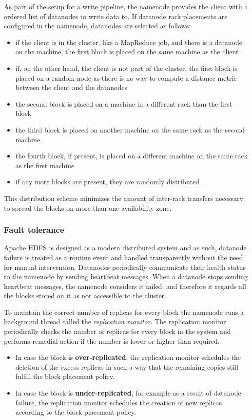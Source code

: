 As part of the setup for a write pipeline, the namenode provides the client with a ordered list of datanodes to write data to.
If datanode rack placements are configured in the namenode, datanodes are selected as follows:
\begin{itemize}
\item if the client is in the cluster, like a MapReduce job, and there is a datanode on the machine, the first block is placed on the same machine as the client
\item if, on the other hand, the client is not part of the cluster, the first block is placed on a random node as there is no way to compute a distance metric between the client and the datanodes
\item the second block is placed on a machine in a different rack than the first block
\item the third block is placed on another machine on the same rack as the second machine
\item the fourth block, if present, is placed on a different machine on the same rack as the first machine
\item if any more blocks are present, they are randomly distributed
\end{itemize}
This distribution scheme minimizes the amount of inter-rack transfers necessary to spread the blocks on more than one availability zone.

\subsubsection{Fault tolerance}
Apache HDFS is designed as a modern distributed system and as such, datanode failure is treated as a routine event and handled transparently without the need for manual intervention.
Datanodes periodically communicate their health status to the namenode by sending heartbeat messages.
When a datanode stops sending heartbeat messages, the namenode considers it failed, and therefore it regards all the blocks stored on it as not accessible to the cluster.

To maintain the correct number of replicas for every block the namenode runs a background thread called the \textit{replication monitor}.
The replication monitor periodically checks the number of replicas for every block in the system and performs remedial action if the number is lower or higher than required.
\begin{itemize}
\item In case the block is \textbf{over-replicated}, the replication monitor schedules the deletion of the excess replicas in such a way that the remaining copies still fulfill the block placement policy.
\item In case the block is \textbf{under-replicated}, for example as a result of datanode failure, the replication monitor schedules the creation of new replicas according to the block placement policy.
\end{itemize}

